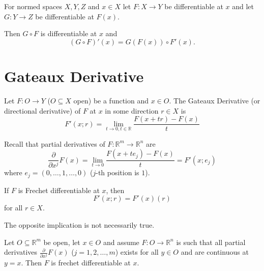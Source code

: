 \begin{prop}
    For normed spaces $X,Y,Z$ and $x \in X$ let $F : X \to Y$
    be differentiable at $x$ and let $G : Y \to Z$ be 
    differentiable at $F(x)$.

    Then $G \circ F$ is differentiable at $x$ and 
    \[
        (G\circ F)'(x) = G(F(x)) \circ F'(x).
    \]
\end{prop}

\newpage 
\section{Gateaux Derivative}
\begin{defn}
    Let $F : O \to Y$ ($O \subseteq X$ open) be a function 
    and $x \in O$. The Gateaux Derivative (or directional derivative)
    of $F$ at $x$ in some direction $r \in X$ is 
    \[
        F'(x;r)=\lim_{t \to 0, t \in \mathbb R} 
        \frac{F(x+tr) - F(x)}{t}
    \]
\end{defn}
Recall that partial derivatives of $F : \mathbb R^m \to \mathbb R^n$
are 
\[
    \frac{\partial}{\partial x^j}F(x) = 
    \lim_{t\to 0}\frac{F(x + te_j)-F(x)}{t} = F'(x;e_j)
\]
where $e_j = (0,\ldots, 1, \ldots, 0)$ ($j$-th position is $1$).

\begin{prop}
    If $F$ is Frechet differentiable at $x$, then 
    \[
        F'(x;r) = F'(x)(r)
    \]
    for all $r \in X$.
\end{prop}
The opposite implication is not necessarily true.

\begin{prop}
    Let $O \subseteq \mathbb R^m$ be open, 
    let $x \in O$ and assume $F : O \to \mathbb R^n$ is 
    such that all partial derivatives 
    $\frac{\partial}{\partial x^j}F(x)$ ($j = 1,2,\ldots,m$)
    exists for all $y \in O$ and are continuous at 
    $y = x$. Then $F$ is frechet differentiable at 
    $x$.
\end{prop}

